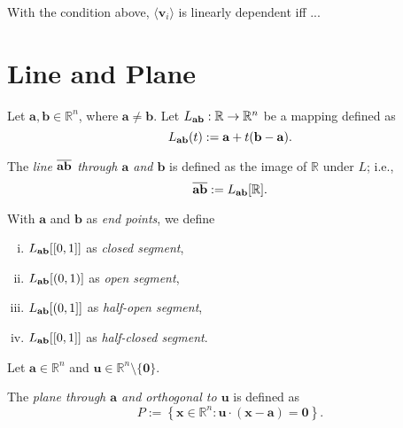 \begin{lemma}
	With the condition above, $\langle \mathbf v_i \rangle$ is linearly dependent iff ...
\end{lemma}






\section{Line and Plane}


\begin{definition}
	\label{def: line}
	Let $\mathbf a, \mathbf b \in \mathbb R^n$, where $\mathbf a \ne \mathbf b$. Let $L_{\bf ab}: \mathbb R \to \mathbb R^n$ be a mapping defined as
	$$
	L_{\bf ab}(t) := \mathbf a + t(\mathbf b - \mathbf a).
	$$
	
	The \textit{line $\overline{\bf ab}$ through $\mathbf a$ and $\mathbf b$} is defined as the image of $\mathbb R$ under $L$; i.e.,
	$$
	\overline{\bf ab} := L_{\bf ab}[\mathbb R].
	$$
	
	With $\mathbf a$ and $\mathbf b$ as \textit{end points}, we define
	\begin{enumerate}[(i)]
		\item $L_{\bf ab}[[0,1]]$ as \textit{closed segment},
		\item $L_{\bf ab}[(0,1)]$ as \textit{open segment},
		\item $L_{\bf ab}[(0,1]]$ as \textit{half-open segment},
		\item $L_{\bf ab}[[0,1]]$ as \textit{half-closed segment}.
	\end{enumerate}
\end{definition}


\begin{definition}
	\label{def: plane}
	Let $\mathbf a \in \mathbb R^n$ and $\mathbf u \in \mathbb R^n \setminus \{\mathbf 0\}$.
	
	The \textit{plane through $\mathbf a$ and orthogonal to $\mathbf u$} is defined as
	$$
	P:= \left\{ \mathbf x \in \mathbb R^n : \mathbf u \cdot (\mathbf x - \mathbf a) = \mathbf 0 \right\}.
	$$
\end{definition}










































%